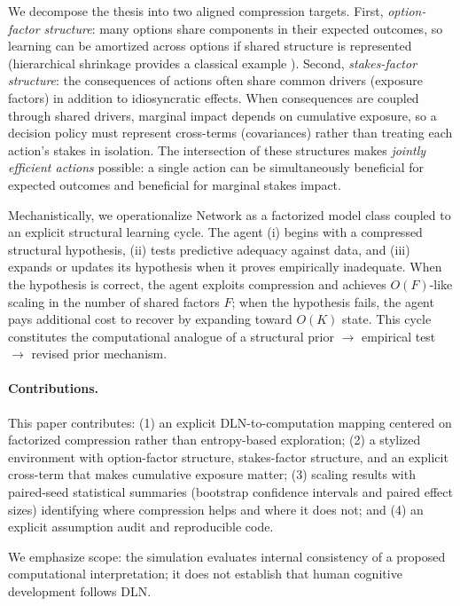 \documentclass[11pt]{article}
\begin{document}
We decompose the thesis into two aligned compression targets. First, \emph{option-factor structure}: many options share components in their expected outcomes, so learning can be amortized across options if shared structure is represented (hierarchical shrinkage provides a classical example \cite{JamesStein1961,EfronMorris1977}). Second, \emph{stakes-factor structure}: the consequences of actions often share common drivers (exposure factors) in addition to idiosyncratic effects. When consequences are coupled through shared drivers, marginal impact depends on cumulative exposure, so a decision policy must represent cross-terms (covariances) rather than treating each action's stakes in isolation. The intersection of these structures makes \emph{jointly efficient actions} possible: a single action can be simultaneously beneficial for expected outcomes and beneficial for marginal stakes impact.

Mechanistically, we operationalize Network as a factorized model class coupled to an explicit structural learning cycle. The agent (i) begins with a compressed structural hypothesis, (ii) tests predictive adequacy against data, and (iii) expands or updates its hypothesis when it proves empirically inadequate. When the hypothesis is correct, the agent exploits compression and achieves $O(F)$-like scaling in the number of shared factors $F$; when the hypothesis fails, the agent pays additional cost to recover by expanding toward $O(K)$ state. This cycle constitutes the computational analogue of a structural prior $\rightarrow$ empirical test $\rightarrow$ revised prior mechanism.

\paragraph{Contributions.}
This paper contributes: (1) an explicit DLN-to-computation mapping centered on factorized compression rather than entropy-based exploration; (2) a stylized environment with option-factor structure, stakes-factor structure, and an explicit cross-term that makes cumulative exposure matter; (3) scaling results with paired-seed statistical summaries (bootstrap confidence intervals and paired effect sizes) identifying where compression helps and where it does not; and (4) an explicit assumption audit and reproducible code.

We emphasize scope: the simulation evaluates internal consistency of a proposed computational interpretation; it does not establish that human cognitive development follows DLN.
\end{document}
